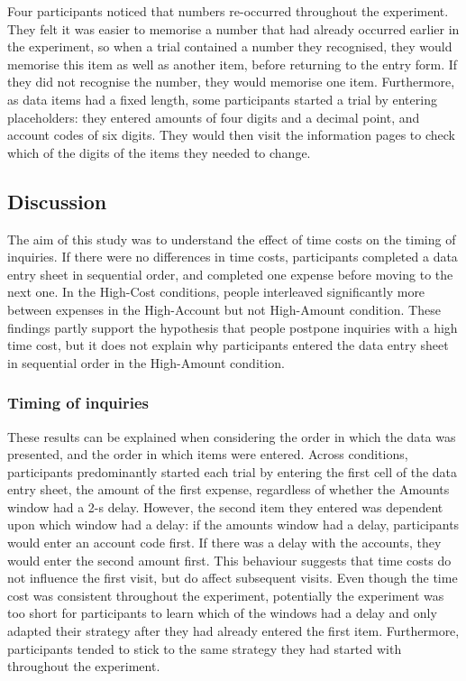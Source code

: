Four participants noticed that numbers re-occurred throughout the experiment. They felt it was easier to memorise a number that had already occurred earlier in the experiment, so when a trial contained a number they recognised, they would memorise this item as well as another item, before returning to the entry form. If they did not recognise the number, they would memorise one item. Furthermore, as data items had a fixed length, some participants started a trial by entering placeholders: they entered amounts of four digits and a decimal point, and account codes of six digits. They would then visit the information pages to check which of the digits of the items they needed to change. 

\subsection{Discussion}
The aim of this study was to understand the effect of time costs on the timing of inquiries. If there were no differences in time costs, participants completed a data entry sheet in sequential order, and completed one expense before moving to the next one. In the High-Cost conditions, people interleaved significantly more between expenses in the High-Account but not High-Amount condition. These findings partly support the hypothesis that people postpone inquiries with a high time cost, but it does not explain why participants entered the data entry sheet in sequential order in the High-Amount condition. 

\subsubsection{Timing of inquiries}
These results can be explained when considering the order in which the data was presented, and the order in which items were entered. Across conditions, participants predominantly started each trial by entering the first cell of the data entry sheet, the amount of the first expense, regardless of whether the Amounts window had a 2-s delay. However, the second item they entered was dependent upon which window had a delay: if the amounts window had a delay, participants would enter an account code first. If there was a delay with the accounts, they would enter the second amount first.
This behaviour suggests that time costs do not influence the first visit, but do affect subsequent visits. Even though the time cost was consistent throughout the experiment, potentially the experiment was too short for participants to learn which of the windows had a delay and only adapted their strategy after they had already entered the first item. Furthermore, participants tended to stick to the same strategy they had started with throughout the experiment.

